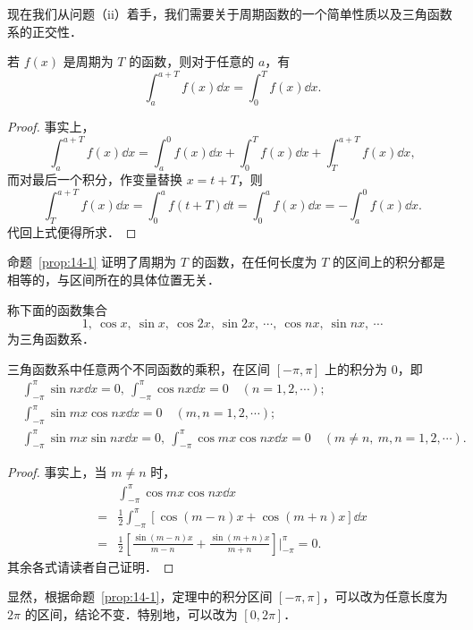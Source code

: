 现在我们从问题（ii）着手，我们需要关于周期函数的一个简单性质以及三角函数系的正交性．

\begin{proposition}\label{prop:14-1}
若 $f(x)$ 是周期为 $T$ 的函数，则对于任意的 $a$，有
\[
\int_{a}^{a+T}f(x)\dd x=\int_{0}^{T}f(x)\dd x.
\]
\end{proposition}

\begin{proof}
事实上，
\[
\int_{a}^{a+T}f(x)\dd x=\int_{a}^{0}f(x)\dd x+\int_{0}^{T}f(x)\dd x+\int_{T}^{a+T}f(x)\dd x,
\]
而对最后一个积分，作变量替换 $x=t+T$，则
\[
\int_{T}^{a+T}f(x)\dd x=\int_{0}^{a}f(t+T)\dd t=\int_{0}^{a}f(x)\dd x=-\int_{a}^{0}f(x)\dd x.
\]
代回上式便得所求．
\end{proof}

命题~\ref{prop:14-1} 证明了周期为 $T$ 的函数，在任何长度为 $T$ 的区间上的积分都是相等的，与区间所在的具体位置无关．

称下面的函数集合
\begin{equation}
1,\ \cos x,\ \sin x,\ \cos 2x,\ \sin 2x,\ \cdots,\ \cos nx,\ \sin nx,\ \cdots
\tag{1}
\end{equation}
为三角函数系．

\begin{theorem}\label{thm:14-1}
三角函数系中任意两个不同函数的乘积，在区间 $[-\pi,\pi]$ 上的积分为 $0$，即
\[
\begin{aligned}
&\int_{-\pi}^{\pi}\sin nx\dd x=0,\ \int_{-\pi}^{\pi}\cos nx\dd x=0\quad(n=1,2,\cdots);\\
&\int_{-\pi}^{\pi}\sin mx\cos nx\dd x=0\quad(m,n=1,2,\cdots);\\
&\int_{-\pi}^{\pi}\sin mx\sin nx\dd x=0,\ \int_{-\pi}^{\pi}\cos mx\cos nx\dd x=0\quad(m\neq n,\ m,n=1,2,\cdots).
\end{aligned}
\]
\end{theorem}

\begin{proof}
事实上，当 $m\neq n$ 时，
\[
\begin{aligned}
&\int_{-\pi}^{\pi}\cos mx\cos nx\dd x\\
={}&\frac{1}{2}\int_{-\pi}^{\pi}\left[\cos(m-n)x+\cos(m+n)x\right]\dd x\\
={}&\frac{1}{2}\left[\frac{\sin(m-n)x}{m-n}+\frac{\sin(m+n)x}{m+n}\right]\bigg|_{-\pi}^{\pi}=0.
\end{aligned}
\]
其余各式请读者自己证明．
\end{proof}

显然，根据命题~\ref{prop:14-1}，定理中的积分区间 $[-\pi,\pi]$，可以改为任意长度为 $2\pi$ 的区间，结论不变．特别地，可以改为 $[0,2\pi]$．

